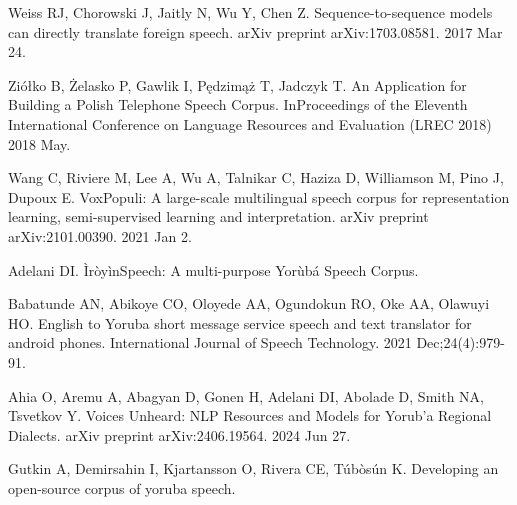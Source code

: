 \documentclass[12pt]{article}
\begin{document}
\begin{thebibliography}{9}
Weiss RJ, Chorowski J, Jaitly N, Wu Y, Chen Z. Sequence-to-sequence models can directly translate foreign speech. arXiv preprint arXiv:1703.08581. 2017 Mar 24.

Ziółko B, Żelasko P, Gawlik I, Pędzimąż T, Jadczyk T. An Application for Building a Polish Telephone Speech Corpus. InProceedings of the Eleventh International Conference on Language Resources and Evaluation (LREC 2018) 2018 May.

Wang C, Riviere M, Lee A, Wu A, Talnikar C, Haziza D, Williamson M, Pino J, Dupoux E. VoxPopuli: A large-scale multilingual speech corpus for representation learning, semi-supervised learning and interpretation. arXiv preprint arXiv:2101.00390. 2021 Jan 2.

  Adelani DI. ÌròyìnSpeech: A multi-purpose Yorùbá Speech Corpus.

Babatunde AN, Abikoye CO, Oloyede AA, Ogundokun RO, Oke AA, Olawuyi HO. English to Yoruba short message service speech and text translator for android phones. International Journal of Speech Technology. 2021 Dec;24(4):979-91.

Ahia O, Aremu A, Abagyan D, Gonen H, Adelani DI, Abolade D, Smith NA, Tsvetkov Y. Voices Unheard: NLP Resources and Models for Yorub'a Regional Dialects. arXiv preprint arXiv:2406.19564. 2024 Jun 27.

Gutkin A, Demirsahin I, Kjartansson O, Rivera CE, Túbòsún K. Developing an open-source corpus of yoruba speech.


\end{thebibliography}
\end{document}
